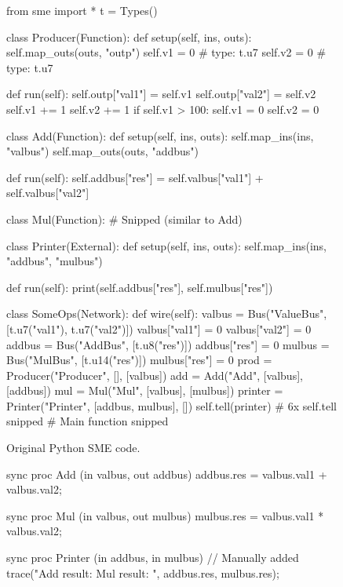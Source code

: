 \begin{widefigure}
  \begin{subfigure}[t]{0.49\textwidth}
  \begin{pythoncode}
from sme import *
t = Types()

class Producer(Function):
  def setup(self, ins, outs):
    self.map_outs(outs, "outp")
    self.v1 = 0  # type: t.u7
    self.v2 = 0  # type: t.u7

  def run(self):
    self.outp["val1"] = self.v1
    self.outp["val2"] = self.v2
    self.v1 += 1
    self.v2 += 1
    if self.v1 > 100:
      self.v1 = 0
      self.v2 = 0

class Add(Function):
  def setup(self, ins, outs):
    self.map_ins(ins, "valbus")
    self.map_outs(outs, "addbus")

  def run(self):
  self.addbus["res"] = self.valbus["val1"] +
             self.valbus["val2"]

class Mul(Function): # Snipped (similar to Add)

class Printer(External):
  def setup(self, ins, outs):
    self.map_ins(ins, "addbus", "mulbus")

  def run(self):
    print(self.addbus["res"],
          self.mulbus["res"])

class SomeOps(Network):
  def wire(self):
    valbus = Bus("ValueBus", [t.u7("val1"),
                              t.u7("val2")])
    valbus["val1"] = 0
    valbus["val2"] = 0
    addbus = Bus("AddBus", [t.u8("res")])
    addbus["res"] = 0
    mulbus = Bus("MulBus", [t.u14("res")])
    mulbus["res"] = 0
    prod = Producer("Producer", [], [valbus])
    add = Add("Add", [valbus], [addbus])
    mul = Mul("Mul", [valbus], [mulbus])
    printer = Printer("Printer",
                      [addbus, mulbus], [])
    self.tell(printer) # 6x self.tell snipped
# Main function snipped
\end{pythoncode}
\caption{Original Python SME code.}
\label{fig:someopspy}
\end{subfigure}
\begin{subfigure}[t]{0.49\textwidth}
  \begin{smeilcode}
sync proc Add (in valbus, out addbus)
{
    addbus.res = valbus.val1 + valbus.val2;
}

sync proc Mul (in valbus, out mulbus)
{
    mulbus.res = valbus.val1 * valbus.val2;
}

sync proc Printer (in addbus, in mulbus)
{
    // Manually added
    trace("Add result: {} Mul result: {}",
        addbus.res, mulbus.res);
}


\end{smeilcode}
\end{subfigure}
\end{widefigure}
